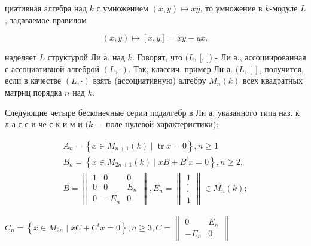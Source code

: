 \documentclass[10pt]{article}
\begin{document}
циативная алгебра над $k$ с умножением $(x, y) \longmapsto x y$, то умножение в $k$-модуле $L$, задаваемое правилом



\[

(x, y) \longmapsto[x, y]=x y-y x,

\]



наделяет $L$ структурой Ли а. над $k$. Говорят, что $(L$, [, ]) - Ли а., ассоциированная с ассоциативной алгеброй $(L, \cdot)$. Так, классич. пример Ли а. $(L,[]$, получится, если в качестве $(L, \cdot)$ взять (ассоциативную) алгебру $M_{n}(k)$ всех квадратных матриц порядка $n$ над $k$.



Следующие четыре бесконечные серии подалгебр в Ли а. указанного типа наз. к л а с с и че с к и м и $(k-$ поле нулевой характеристики):



\[

\begin{gathered}

A_{n}=\left\{x \in M_{n+1}(k) \mid \operatorname{tr} x=0\right\}, n \geqslant 1 \\

B_{n}=\left\{x \in M_{2 n+1}(k) \mid x B+B^{t} x=0\right\}, n \geqslant 2, \\

B=\left\|\begin{array}{ccc}

1 & 0 & 0 \\

0 & 0 & E_{n} \\

0 & -E_{n} & 0

\end{array}\right\|, E_{n}=\left\|\begin{array}{c}

1 \\

\cdot \\

\cdot \\

1

\end{array}\right\| \in M_{n}(k) ;

\end{gathered}

\]



$C_{n}=\left\{x \in M_{2 n} \mid x C+C^{t} x=0\right\}, n \geqslant 3, C=\left\|\begin{array}{cc}0 & E_{n} \\ -E_{n} & 0\end{array}\right\|$
\end{document}
